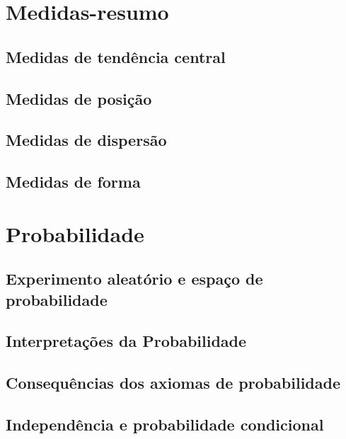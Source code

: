 \documentclass[
  letterpaper,
]{book}
\theoremstyle{definition}
\theoremstyle{plain}
\theoremstyle{remark}
\begin{document}
\part{Medidas-resumo}

\chapter{Medidas de tendência
central}\label{medidas-de-tenduxeancia-central}

\chapter{Medidas de posição}\label{medidas-de-posiuxe7uxe3o}

\chapter{Medidas de dispersão}\label{medidas-de-dispersuxe3o}

\chapter{Medidas de forma}\label{medidas-de-forma}

\part{Probabilidade}

\chapter{Experimento aleatório e espaço de
probabilidade}\label{experimento-aleatuxf3rio-e-espauxe7o-de-probabilidade}

\chapter{Interpretações da
Probabilidade}\label{interpretauxe7uxf5es-da-probabilidade}

\chapter{Consequências dos axiomas de
probabilidade}\label{consequuxeancias-dos-axiomas-de-probabilidade}

\chapter{Independência e probabilidade
condicional}\label{independuxeancia-e-probabilidade-condicional}
\end{document}
